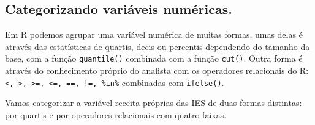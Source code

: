 \documentclass[11pt,]{style/krantz}
\makeatletter
\newenvironment{Shaded}{\begin{snugshade}}{\end{snugshade}}
\newcommand{\CommentTok}[1]{\textcolor[rgb]{0.56,0.35,0.01}{\textit{#1}}}
\newcommand{\DataTypeTok}[1]{\textcolor[rgb]{0.13,0.29,0.53}{#1}}
\newcommand{\DecValTok}[1]{\textcolor[rgb]{0.00,0.00,0.81}{#1}}
\newcommand{\KeywordTok}[1]{\textcolor[rgb]{0.13,0.29,0.53}{\textbf{#1}}}
\newcommand{\NormalTok}[1]{#1}
\newcommand{\OperatorTok}[1]{\textcolor[rgb]{0.81,0.36,0.00}{\textbf{#1}}}
\newcommand{\OtherTok}[1]{\textcolor[rgb]{0.56,0.35,0.01}{#1}}
\newcommand{\StringTok}[1]{\textcolor[rgb]{0.31,0.60,0.02}{#1}}
\newenvironment{kframe}{%
\medskip{}
\setlength{\fboxsep}{.8em}
 \def\at@end@of@kframe{}%
 \ifinner\ifhmode%
  \def\at@end@of@kframe{\end{minipage}}%
  \begin{minipage}{\columnwidth}%
 \fi\fi%
 \def\FrameCommand##1{\hskip\@totalleftmargin \hskip-\fboxsep
 \colorbox{shadecolor}{##1}\hskip-\fboxsep
     \hskip-\linewidth \hskip-\@totalleftmargin \hskip\columnwidth}%
 \MakeFramed {\advance\hsize-\width
   \@totalleftmargin\z@ \linewidth\hsize
   \@setminipage}}%
 {\par\unskip\endMakeFramed%
 \at@end@of@kframe}
\renewenvironment{Shaded}{\begin{kframe}}{\end{kframe}}
\theoremstyle{definition}
\theoremstyle{definition}
\theoremstyle{definition}
\theoremstyle{remark}
\let\BeginKnitrBlock\begin \let\EndKnitrBlock\end
\makeatother
\begin{document}
\hypertarget{categorizando-variaveis-numericas.}{%
\subsection{Categorizando variáveis numéricas.}\label{categorizando-variaveis-numericas.}}

Em R podemos agrupar uma variável numérica de muitas formas, umas delas é através das estatísticas de quartis, decis ou percentis dependendo do tamanho da base, com a função \texttt{quantile()} combinada com a função \texttt{cut()}. Outra forma é através do conhecimento próprio do analista com os operadores relacionais do R: \texttt{\textless{},\ \textgreater{},\ \textgreater{}=,\ \textless{}=,\ ==,\ !=,\ \%in\%} combinadas com \texttt{ifelse()}.

\BeginKnitrBlock{example}
\protect\hypertarget{exm:unnamed-chunk-80}{}{\label{exm:unnamed-chunk-80} }Vamos categorizar a variável receita próprias das IES de duas formas distintas: por quartis e por operadores relacionais com quatro faixas.
\EndKnitrBlock{example}

\begin{Shaded}
\end{Shaded}
\end{document}
